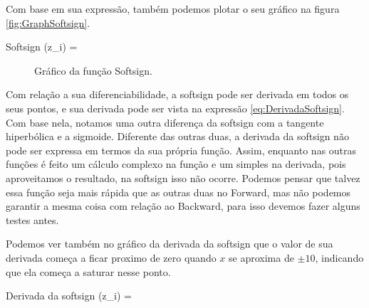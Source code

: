 Com base em sua expressão, também podemos plotar o seu gráfico na figura \ref{fig:GraphSoftsign}.

\begin{equacaodestaque}{Softsign}
    (z_i) = 
    \label{eq:softsign}
\end{equacaodestaque}

\begin{figure}[h!]
    \centering
    \caption{Gráfico da função Softsign.}
\end{figure}

Com relação a sua diferenciabilidade, a softsign pode ser derivada em todos os seus pontos, e sua derivada pode ser vista na expressão \ref{eq:DerivadaSoftsign}. Com base nela, notamos uma outra diferença da softsign com a tangente hiperbólica e a sigmoide. Diferente das outras duas, a derivada da softsign não pode ser expressa em termos da sua própria função. Assim, enquanto nas outras funções é feito um cálculo complexo na função e um simples na derivada, pois aproveitamos o resultado, na softsign isso não ocorre. Podemos pensar que talvez essa função seja mais rápida que as outras duas no Forward, mas não podemos garantir a mesma coisa com relação ao Backward, para isso devemos fazer alguns testes antes.

Podemos ver também no gráfico da derivada da softsign que o valor de sua derivada começa a ficar proximo de zero quando $x$ se aproxima de $\pm 10$, indicando que ela começa a saturar nesse ponto.

\begin{equacaodestaque}{Derivada da softsign}
    (z_i) = 
    \label{eq:softsgin-derivada}
\end{equacaodestaque}

